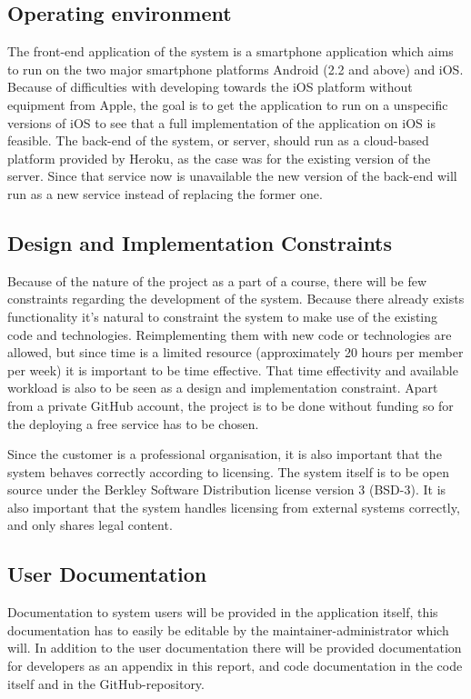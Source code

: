 \subsection{Operating environment}
The front-end application of the system is a smartphone application which aims to run on the two major smartphone platforms Android (2.2 and above) and iOS. Because of difficulties with developing towards the iOS platform without equipment from Apple, the goal is to get the application to run on a unspecific versions of iOS to see that a full implementation of the application on iOS is feasible. The back-end of the system, or server, should run as a cloud-based platform provided by Heroku, as the case was for the existing version of the server. Since that service now is unavailable the new version of the back-end will run as a new service instead of replacing the former one. 

\subsection{Design and Implementation Constraints}
Because of the nature of the project as a part of a course, there will be few constraints regarding the development of the system. Because there already exists functionality it's natural to constraint the system to make use of the existing code and technologies. Reimplementing them with new code or technologies are allowed, but since time is a limited resource (approximately 20 hours per member per week) it is important to be time effective. That time effectivity and available workload is also to be seen as a design and implementation constraint. Apart from a private GitHub account, the project is to be done without funding so for the deploying a free service has to be chosen.

\noindent

Since the customer is a professional organisation, it is also important that the system behaves correctly according to licensing. The system itself is to be open source under the Berkley Software Distribution license version 3 (BSD-3). It is also important that the system handles licensing from external systems correctly, and only shares legal content.

\subsection{User Documentation}

Documentation to system users will be provided in the application itself, this documentation has to easily be editable by the maintainer-administrator which will. In addition to the user documentation there will be provided documentation for developers as an appendix in this report, and code documentation in the code itself and in the GitHub-repository. 

